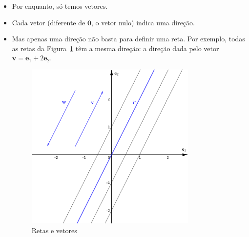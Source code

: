 \documentclass[
  letterpaper,
  DIV=11,
  numbers=noendperiod]{scrreprt}
\begin{document}
\begin{itemize}
\item
  Por enquanto, só temos vetores.
\item
  Cada vetor (diferente de $\mathbf{0}$, o vetor nulo) indica uma
  direção.
\item
  Mas apenas uma direção não basta para definir uma reta. Por exemplo,
  todas as retas da Figura~\ref{fig-retas} têm a mesma direção: a
  direção dada pelo vetor
  $\mathbf{v} = \mathbf{e}_{1} + 2\mathbf{e}_{2}$.

  \begin{figure}[t]

  {\centering \includegraphics[width=0.8\textwidth,height=\textheight]{figures/reta-homogenea.png}

  }

  \caption{\label{fig-retas}Retas e vetores}


\end{figure}
\end{itemize}
\end{document}
